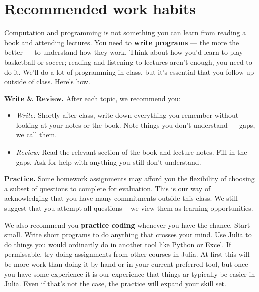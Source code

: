 \documentclass[11pt]{article}
\begin{document}
\section*{Recommended work habits}

Computation and programming is not something you can learn from reading a book
and attending lectures. You need to {\bf write programs\/} --- the more the
better --- to understand how they work. Think about how you'd learn to play
basketball or soccer; reading and listening to lectures aren't enough, you need
to do it. We'll do a lot of programming in class, but it's {essential\/} that
you follow up outside of class. Here's how.


{\bf Write \& Review.\/}
After each topic, we recommend you:
%
\begin{itemize}
\item {\it Write:\/}  Shortly after class, write down everything you remember
without looking at your notes or the book.
Note things you don't understand --- gaps, we call them.
\item {\it Review:\/} Read the relevant section of the book and lecture notes.
Fill in the gaps. Ask for help with anything you still don't understand.
\end{itemize}
%

{\bf Practice.\/} Some homework assignments may afford you the flexibility of
choosing a subset of questions to complete for evaluation. This is our way of
acknowledging that you have many commitments outside this class. We still
suggest that you attempt all questions -- we view them as learning
opportunities.

We also recommend you {\bf practice coding\/} whenever you have the chance.
Start small. Write short programs to do anything that crosses your mind. Use
Julia to do things you would ordinarily do in another tool like Python or Excel.
If permissable, try doing assignments from other courses in Julia. At first this
will be more work than doing it by hand or in your current preferred tool, but
once you have some experience it is our experience that things ar typically be
easier in Julia. Even if that's not the case, the practice will expand your
skill set.
\end{document}
